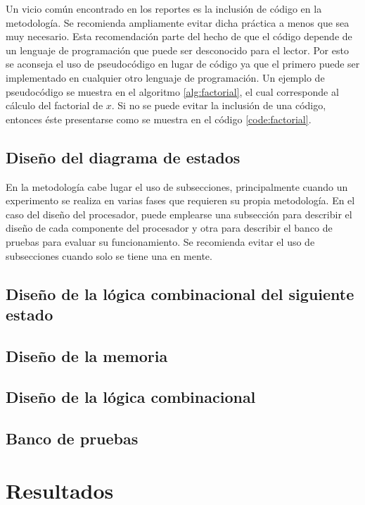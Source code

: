 \documentclass[11pt, twocolumn]{article}
\begin{document}
Un vicio común encontrado en los reportes es la inclusión de código en la metodología. Se recomienda ampliamente evitar dicha práctica a menos que sea muy necesario. Esta recomendación parte del hecho de que el código depende de un lenguaje de programación que puede ser desconocido para el lector. Por esto se aconseja el uso de pseudocódigo en lugar de código ya que el primero puede ser implementado en cualquier otro lenguaje de programación. Un ejemplo de pseudocódigo se muestra en el algoritmo \ref{alg:factorial}, el cual corresponde al cálculo del factorial de $x$. Si no se puede evitar la inclusión de una código, entonces éste presentarse como se muestra en el código \ref{code:factorial}.



\subsection{Diseño del diagrama de estados}
En la metodología cabe lugar el uso de subsecciones, principalmente cuando un experimento se realiza en varias fases que requieren su propia metodología. En el caso del diseño del procesador, puede emplearse una subsección para describir el diseño de cada componente del procesador y otra para describir el banco de pruebas para evaluar su funcionamiento. Se recomienda evitar el uso de subsecciones cuando solo se tiene una en mente.

\subsection{Diseño de la lógica combinacional del siguiente estado}

\subsection{Diseño de la memoria}

\subsection{Diseño de la lógica combinacional}

\subsection{Banco de pruebas}

\section{Resultados}\label{sec:results}
\end{document}
